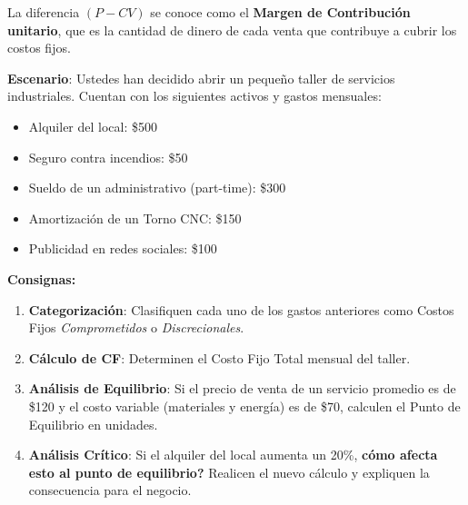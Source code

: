 \documentclass[../main]{subfiles}
\begin{document}
La diferencia $(P - CV)$ se conoce como el \textbf{Margen de Contribución unitario}, que es la cantidad de dinero de cada venta que contribuye a cubrir los costos fijos.



\textbf{Escenario}: Ustedes han decidido abrir un pequeño taller de servicios industriales. Cuentan con los siguientes activos y gastos mensuales:
\begin{itemize}
  \item Alquiler del local: \$500
  \item Seguro contra incendios: \$50
  \item Sueldo de un administrativo (part-time): \$300
  \item Amortización de un Torno CNC: \$150
  \item Publicidad en redes sociales: \$100
\end{itemize}

\textbf{Consignas:}
\begin{enumerate}
  \item \textbf{Categorización}: Clasifiquen cada uno de los gastos anteriores como Costos Fijos \textit{Comprometidos} o \textit{Discrecionales}.
  \item \textbf{Cálculo de CF}: Determinen el Costo Fijo Total mensual del taller.
  \item \textbf{Análisis de Equilibrio}: Si el precio de venta de un servicio promedio es de \$120 y el costo variable (materiales y energía) es de \$70, calculen el Punto de Equilibrio en unidades.
  \item \textbf{Análisis Crítico}: Si el alquiler del local aumenta un 20\%, \textbf{cómo afecta esto al punto de equilibrio?} Realicen el nuevo cálculo y expliquen la consecuencia para el negocio.
\end{enumerate}
\end{document}

